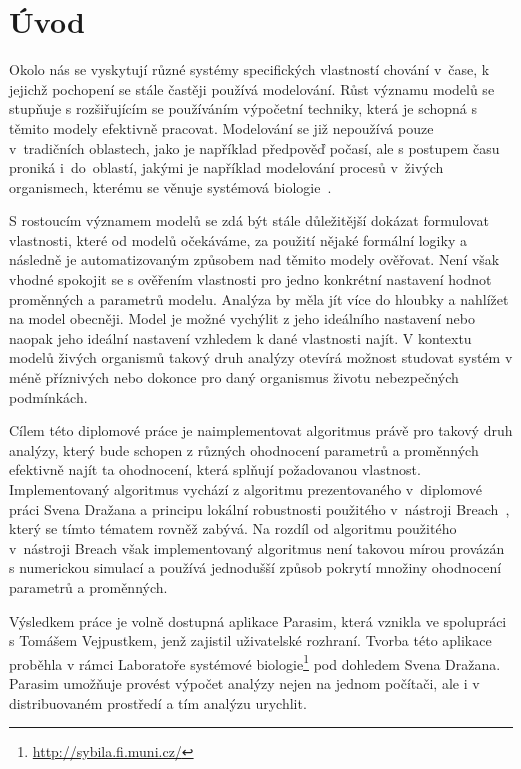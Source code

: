 \chapter{Úvod}\label{chapter:introduction}

Okolo nás se vyskytují různé systémy specifických vlastností chování v~ča\-se, k jejichž
pochopení se stále častěji používá modelování. Růst významu modelů se stupňuje
s rozšiřujícím se používáním výpočetní techniky, která je schopná s těmito modely
efektivně pracovat. Modelování se již nepoužívá pouze v~tradičních oblastech, jako je například
předpověď počasí, ale s postupem času proniká i~do~oblastí, jakými je například
modelování procesů v~živých organismech, kte\-ré\-mu se věnuje systémová biologie~\cite{westerhoff2005}.

S rostoucím významem modelů se zdá být stále důležitější dokázat formulovat
vlastnosti, které od modelů očekáváme, za použití nějaké for\-mál\-ní logiky a následně
je automatizovaným způsobem nad těmito modely o\-vě\-řo\-vat. Není však vhodné spokojit se s ověřením
vlastnosti pro jedno konkrétní nastavení hodnot proměnných a parametrů modelu. Analýza
by měla jít více do hloubky a nahlížet na model obecněji. Model je možné vychýlit z jeho ideálního
nastavení nebo naopak jeho ideální nastavení vzhledem k dané vlastnosti najít. V kontextu
modelů živých organismů takový druh analýzy otevírá možnost studovat systém v méně příznivých
nebo dokonce pro daný organismus životu nebezpečných podmínkách.

Cílem této diplomové práce je naimplementovat algoritmus právě pro takový druh analýzy,
který bude schopen z různých ohodnocení parametrů a proměnných efektivně najít ta ohodnocení,
která splňují požadovanou vlastnost. Implementovaný algoritmus vychází z algoritmu
prezentova\-né\-ho v~di\-plo\-mo\-vé práci Svena Dražana \cite{drazan2011} a principu lokální robustnosti použitého v~ná\-stro\-ji Breach~\cite{donze2010breach},
který se tímto té\-ma\-tem rovněž zabývá. Na rozdíl od algoritmu pou\-ži\-té\-ho v~ná\-stro\-ji Breach však
implementovaný algoritmus není takovou mírou pro\-vá\-zán s numerickou simulací a používá
jednodušší způ\-sob pokrytí množiny ohodnocení parametrů a proměnných.

Výsledkem práce je volně dostupná aplikace Parasim, která vznikla ve spolupráci s Tomášem Vejpustkem,
jenž zajistil uživatelské rozhraní. Tvor\-ba této aplikace proběhla v rámci Laboratoře
systémové biologie\footnote{\url{http://sybila.fi.muni.cz/}} pod dohledem Svena Dražana.
Parasim umožňuje provést výpočet analýzy nejen na jednom počítači, ale i v distribuovaném
prostředí a tím analýzu urychlit.

